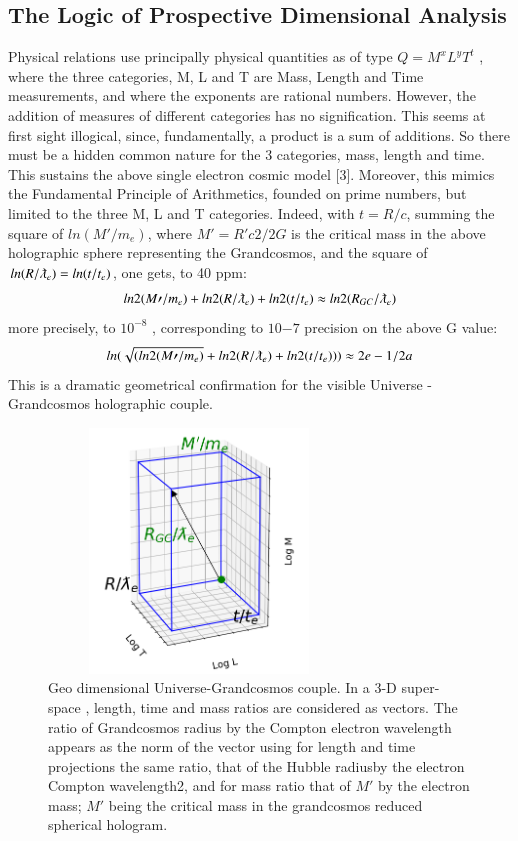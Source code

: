 \documentclass[twoside,draft]{article}
\begin{document}
\begin{sloppypar}
{\subsection{The Logic of Prospective Dimensional Analysis}

Physical relations use principally physical quantities as of type $Q = M^{x} L^{y} T^{t}$ , where
the three categories, M, L and T are Mass, Length and Time measurements, and where the exponents are
rational numbers. However, the addition of measures of different categories has no signification.
This seems at first sight illogical, since, fundamentally, a product is a sum of additions. So there
must be a hidden common nature for the 3 categories, mass, length and time. This sustains the
above single electron cosmic model [3]. Moreover, this mimics the Fundamental Principle of
Arithmetics, founded on prime numbers, but limited to the three M, L and T categories. Indeed, with $t =
R/c$, summing the square of $ln(M\prime/m_{e} )$, where $M\prime = R\prime c 2 /2G$ is the critical mass in the above
holographic sphere representing the Grandcosmos, and the square of $ln(R/\lambdabar_{e} ) = ln(t/t_{e} )$, one gets, to
40 ppm:
\begin{equation}
ln 2 (M\prime/m_{e} ) + ln 2 (R/\lambdabar_{e}) + ln 2 (t/t_{e} ) \approx ln 2 (R_{GC} /\lambdabar_{e} )
\end{equation}
more precisely, to $10^{-8}$ , corresponding to $10{-7}$ precision on the above G value:
\begin{equation}
ln(\sqrt{(ln 2 (M\prime/m_{e} )} + ln 2 (R/\lambdabar_{e} ) + ln 2 (t/t_{e} ))) \approx 2e - 1/2a
\end{equation}
This is a dramatic geometrical confirmation for the visible Universe - Grandcosmos holographic
couple.

\begin{figure}[h]
\centering
\includegraphics[width=8cm,height=6.5cm]{./figures/triaxis.png}
\caption{Geo dimensional Universe-Grandcosmos couple. In a 3-D super-space , length, time and mass ratios are considered as vectors. The ratio of Grandcosmos radius by the Compton electron wavelength appears as the norm of the vector using for length and time projections the same ratio, that of the Hubble radiusby the electron Compton wavelength2, and for mass ratio that of $M\prime$ by the electron mass; $M\prime$ being the critical mass in the grandcosmos reduced spherical hologram. }
\end{figure}

}
\end{sloppypar}
\end{document}
